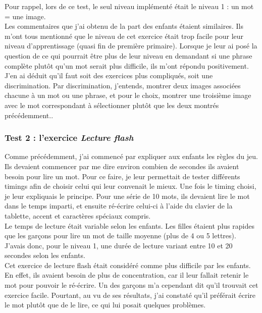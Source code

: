 Pour rappel, lors de ce test, le seul niveau implémenté était le niveau 1 : un mot = une image.\\

Les commentaires que j'ai obtenu de la part des enfants étaient similaires. Ils m'ont tous mentionné que le niveau de cet exercice était trop facile pour leur niveau d'apprentissage (quasi fin de première primaire). Lorsque je leur ai posé la question de ce qui pourrait être plus de leur niveau en demandant si une phrase complète plutôt qu'un mot serait plus difficile, ils m'ont répondu positivement. J'en ai déduit qu'il faut soit des exercices plus compliqués, soit une discrimination. Par discrimination, j'entends, montrer deux images associées chacune à un mot ou une phrase, et pour le choix, montrer une troisième image avec le mot correspondant à sélectionner plutôt que les deux montrés précédemment..

\subsubsection{Test 2 : l'exercice \textit{Lecture flash}}
Comme précédemment, j'ai commencé par expliquer aux enfants les règles du jeu.
Ils devaient commencer par me dire environ combien de secondes ils avaient besoin pour lire un mot. Pour ce faire, je leur permettait de tester différents timings afin de choisir celui qui leur convenait le mieux. Une fois le timing choisi, je leur expliquais le principe. Pour une série de 10 mots, ils devaient lire le mot dans le temps imparti, et ensuite ré-écrire celui-ci à l'aide du clavier de la tablette, accent et caractères spéciaux compris.\\

Le temps de lecture était variable selon les enfants. Les filles étaient plus rapides que les garçons pour lire un mot de taille moyenne (plus de 4 ou 5 lettres). J'avais donc, pour le niveau 1, une durée de lecture variant entre 10 et 20 secondes selon les enfants.\\

Cet exercice de lecture flash était considéré comme plus difficile par les enfants. En effet, ils avaient besoin de plus de concentration, car il leur fallait retenir le mot pour pouvoir le ré-écrire. Un des garçons m'a cependant dit qu'il trouvait cet exercice facile. Pourtant, au vu de ses résultats, j'ai constaté qu'il préférait écrire le mot plutôt que de le lire, ce qui lui posait quelques problèmes.\\

